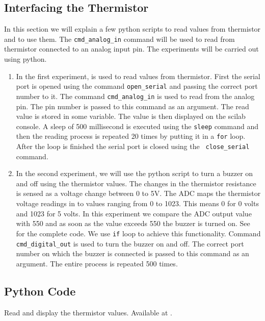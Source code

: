 \subsection{Interfacing the Thermistor}
In this section we will explain a few python scripts to read values
from thermistor and to use them.  The {\tt cmd\_analog\_in} command
will be used to read from thermistor connected to an analog input
pin. The experiments will be carried out using python.

\begin{enumerate}
\item In the first experiment,  is used to read
  values from thermistor. First the serial port is opened using the
  command {\tt open\_serial} and passing the correct port number to
  it. The command {\tt cmd\_analog\_in} is used to read from the
  analog pin. The pin number is passed to this command as an
  argument. The read value is stored in some variable. The value is
  then displayed on the scilab console. A sleep of 500 millisecond is
  executed using the {\tt sleep} command and then the reading process
  is repeated 20 times by putting it in a {\tt for} loop. After the
  loop is finished the serial port is closed using the {\tt
    close\_serial} command.

\item In the second experiment, we will use the python script to
  turn a buzzer on and off using the thermistor values. The changes in
  the thermistor resistance is sensed as a voltage change between 0 to
  5V. The ADC maps the thermistor voltage readings in to values
  ranging from 0 to 1023. This means 0 for 0 volts and 1023 for 5
  volts. In this experiment we compare the ADC output value with 550
  and as soon as the value exceeds 550 the buzzer is turned on. See
   for the complete code. We use {\tt if}
  loop to achieve this functionality. Command {\tt cmd\_digital\_out}
  is used to turn the buzzer on and off.  The correct port number on
  which the buzzer is connected is passed to this command as an
  argument. The entire process is repeated 500 times.
\end{enumerate}

\subsection{Python Code}
\label{sec:therm-pyhton-code}

\begin{pycode}
   {Read and display
    the thermistor values.  Available at
    .}
\label{py:therm-read}

\end{pycode}

